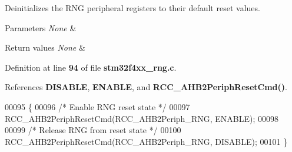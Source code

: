 Deinitializes the R\+NG peripheral registers to their default reset values. 


\begin{DoxyParams}{Parameters}
{\em None} & \\
\hline
\end{DoxyParams}

\begin{DoxyRetVals}{Return values}
{\em None} & \\
\hline
\end{DoxyRetVals}


Definition at line \textbf{ 94} of file \textbf{ stm32f4xx\+\_\+rng.\+c}.



References \textbf{ D\+I\+S\+A\+B\+LE}, \textbf{ E\+N\+A\+B\+LE}, and \textbf{ R\+C\+C\+\_\+\+A\+H\+B2\+Periph\+Reset\+Cmd()}.


\begin{DoxyCode}
00095 \{
00096   \textcolor{comment}{/* Enable RNG reset state */}
00097   RCC_AHB2PeriphResetCmd(RCC_AHB2Periph_RNG, ENABLE);
00098 
00099   \textcolor{comment}{/* Release RNG from reset state */}
00100   RCC_AHB2PeriphResetCmd(RCC_AHB2Periph_RNG, DISABLE);
00101 \}
\end{DoxyCode}
